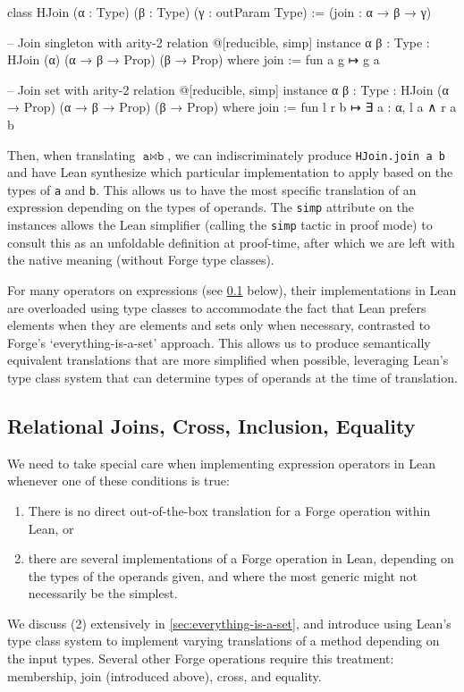 \begin{leanimpl*}
class HJoin (α : Type) (β : Type) (γ : outParam Type) :=
  (join : α → β → γ)

-- Join singleton with arity-2 relation
@[reducible, simp] instance {α β : Type} : HJoin (α) (α → β → Prop) (β → Prop) where
  join := fun a g ↦ g a

-- Join set with arity-2 relation
@[reducible, simp] instance {α β : Type} : HJoin (α → Prop) (α → β → Prop) (β → Prop) where
  join := fun l r b ↦ ∃ a : α, l a ∧ r a b
\end{leanimpl*}

Then, when translating $\texttt{a}\bowtie \texttt{b}$, we can indiscriminately produce \texttt{HJoin.join a b} and have Lean synthesize which particular implementation to apply based on the types of \texttt{a} and \texttt{b}. This allows us to have the most specific translation of an expression depending on the types of operands. The \texttt{simp} attribute on the instances allows the Lean simplifier (calling the \texttt{simp} tactic in proof mode) to consult this as an unfoldable definition at proof-time, after which we are left with the native meaning (without Forge type classes).

For many operators on expressions (see \cref{sec:join-cross-subset} below), their implementations in Lean are overloaded using type classes to accommodate the fact that Lean prefers elements when they are elements and sets only when necessary, contrasted to Forge's `everything-is-a-set' approach. This allows us to produce semantically equivalent translations that are more simplified when possible, leveraging Lean's type class system that can determine types of operands at the time of translation. 

\subsection{Relational Joins, Cross, Inclusion, Equality}\label{sec:join-cross-subset}

We need to take special care when implementing expression operators in Lean whenever one of these conditions is true: 
\begin{enumerate}[(1)]
  \item There is no direct out-of-the-box translation for a Forge operation within Lean, or
  \item there are several implementations of a Forge operation in Lean, depending on the types of the operands given, and where the most generic might not necessarily be the simplest. 
\end{enumerate}
We discuss (2) extensively in \cref{sec:everything-is-a-set}, and introduce using Lean's type class system to implement varying translations of a method depending on the input types. Several other Forge operations require this treatment: membership, join (introduced above), cross, and equality. 

